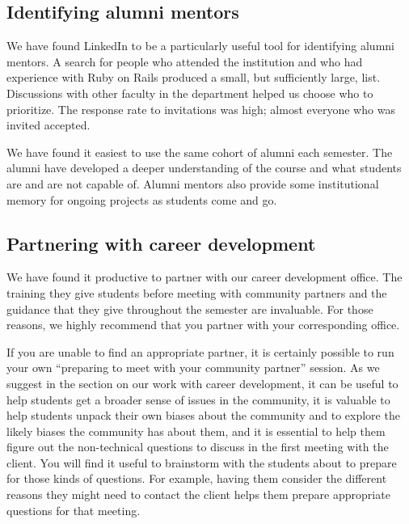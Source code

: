 \subsection{Identifying alumni mentors}

We have found LinkedIn to be a particularly useful tool for identifying
alumni mentors.  A search for people who attended the institution and
who had experience with Ruby on Rails produced a small, but sufficiently
large, list.  Discussions with other faculty in the department helped
us choose who to prioritize.  The response rate to invitations was high;
almost everyone who was invited accepted.


We have found it easiest to use the same cohort of alumni each semester.
The alumni have developed a deeper understanding of the course and what
students are and are not capable of.  Alumni mentors also provide some 
institutional memory for ongoing projects as students come and go. 

\subsection{Partnering with career development}

We have found it productive to partner with our career development
office.  The training they give students before meeting with community
partners and the guidance that they give throughout the semester
are invaluable.  For those reasons, we highly recommend that you
partner with your corresponding office.

If you are unable to find an appropriate partner, it is certainly
possible to run your own ``preparing to meet with your community
partner'' session.  As we suggest in the section on our work with
career development, it can be useful to help students get a broader
sense of issues in the community, it is valuable to help students
unpack their own biases about the community and to explore the
likely biases the community has about them, and it is essential to
help them figure out the non-technical questions to discuss in the
first meeting with the client.  You will find it useful to brainstorm
with the students about to prepare for those kinds of questions.
For example, having them consider the different reasons they might
need to contact the client helps them prepare appropriate questions
for that meeting.

